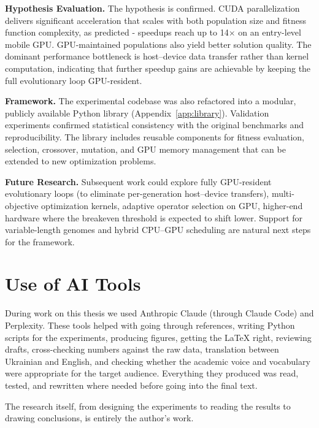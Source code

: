 \bigskip\textbf{Hypothesis Evaluation.} The hypothesis is confirmed. CUDA parallelization delivers significant acceleration that scales with both population size and fitness function complexity, as predicted - speedups reach up to 14$\times$ on an entry-level mobile GPU. GPU-maintained populations also yield better solution quality. The dominant performance bottleneck is host--device data transfer rather than kernel computation, indicating that further speedup gains are achievable by keeping the full evolutionary loop GPU-resident.

\bigskip\textbf{Framework.} The experimental codebase was also refactored into a modular, publicly available Python library (Appendix~\ref{app:library}). Validation experiments confirmed statistical consistency with the original benchmarks and reproducibility. The library includes reusable components for fitness evaluation, selection, crossover, mutation, and GPU memory management that can be extended to new optimization problems.

\bigskip\textbf{Future Research.} Subsequent work could explore fully GPU-resident evolutionary loops (to eliminate per-generation host--device transfers), multi-objective optimization kernels, adaptive operator selection on GPU, higher-end hardware where the breakeven threshold is expected to shift lower. Support for variable-length genomes and hybrid CPU--GPU scheduling are natural next steps for the framework.


\newpage
\section*{Use of AI Tools}

During work on this thesis we used Anthropic Claude (through Claude Code) and Perplexity. These tools helped with going through references, writing Python scripts for the experiments, producing figures, getting the \LaTeX{} right, reviewing drafts, cross-checking numbers against the raw data, translation between Ukrainian and English, and checking whether the academic voice and vocabulary were appropriate for the target audience. Everything they produced was read, tested, and rewritten where needed before going into the final text.

The research itself, from designing the experiments to reading the results to drawing conclusions, is entirely the author's work.

